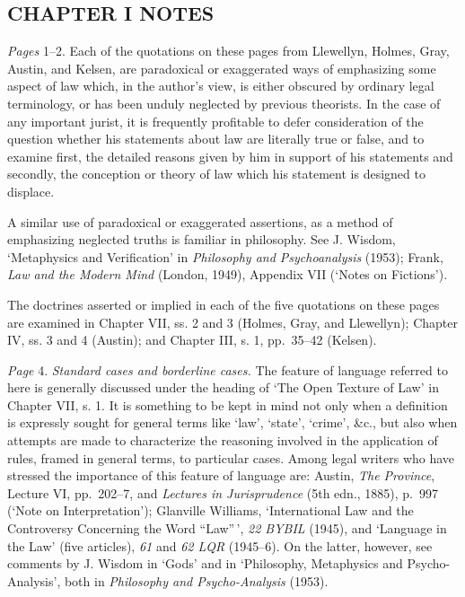 \documentclass[12pt,oneside]{book}  %
\begin{document}
\subsection{CHAPTER I NOTES}\label{chapter-i-notes}

\emph{Pages} 1--2. Each of the quotations on these pages from Llewellyn,
Holmes, Gray, Austin, and Kelsen, are paradoxical or exaggerated ways of
emphasizing some aspect of law which, in the author's view, is either
obscured by ordinary legal terminology, or has been unduly neglected by
previous theorists. In the case of any important jurist, it is
frequently profitable to defer consideration of the question whether his
statements about law are literally true or false, and to examine first,
the detailed reasons given by him in support of his statements and
secondly, the conception or theory of law which his statement is
designed to displace.

A similar use of paradoxical or exaggerated assertions, as a method of
emphasizing neglected truths is familiar in philosophy. See J. Wisdom,
`Metaphysics and Verification' in \emph{Philosophy and Psychoanalysis}
(1953); Frank, \emph{Law and the Modern Mind} (London, 1949), Appendix
VII (`Notes on Fictions').

The doctrines asserted or implied in each of the five quotations on
these pages are examined in Chapter VII, ss. 2 and 3 (Holmes, Gray, and
Llewellyn); Chapter IV, ss. 3 and 4 (Austin); and Chapter III, s. 1,
pp.~35--42 (Kelsen).

\emph{Page} 4. \emph{Standard cases and borderline cases.} The feature
of language referred to here is generally discussed under the heading of
`The Open Texture of Law' in Chapter VII, s. 1. It is something to be
kept in mind not only when a definition is expressly sought for general
terms like `law', `state', `crime', \&c., but also when attempts are
made to characterize the reasoning involved in the application of rules,
framed in general terms, to particular cases. Among legal writers who
have stressed the importance of this feature of language are: Austin,
\emph{The Province}, Lecture VI, pp.~202--7, and \emph{Lectures in
Jurisprudence} (5th edn., 1885), p.~997 (`Note on Interpretation');
Glanville Williams, `International Law and the Controversy Concerning
the Word ``Law''\,', \emph{22 BYBIL} (1945), and `Language in the Law'
(five articles), \emph{61} and \emph{62 LQR} (1945--6). On the latter,
however, see comments by J. Wisdom in `Gods' and in `Philosophy,
Metaphysics and Psycho-Analysis', both in \emph{Philosophy and
Psycho-Analysis} (1953).
\end{document}

